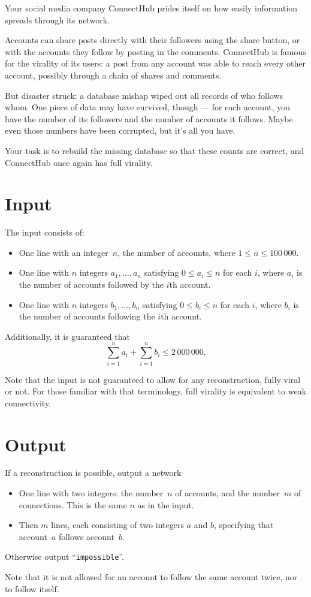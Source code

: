 Your social media company ConnectHub prides itself on how easily 
information spreads through its network.

Accounts can share posts directly with their followers using the 
share button, or with the accounts they follow by posting in the comments. 
ConnectHub is famous for the virality of its users: a post from any account 
was able to reach every other account, possibly through a chain of shares and comments.

But disaster struck: a database mishap wiped out all records of who follows whom. 
One piece of data may have survived, though — for each account, you have the number 
of its followers and the number of accounts it follows.
Maybe even those numbers have been corrupted, but it's all you have.

Your task is to rebuild the missing database so that these counts are correct, 
and ConnectHub once again has full virality.

\section*{Input}

The input consists of:
\begin{itemize}
\item
One line with an integer~$n$, the number of accounts, where $1 \leq n \leq 100\,000$.
\item
 One line with $n$ integers $a_1,\ldots, a_n$ satisfying $0 \leq a_i \leq n$ for each $i$,
 where $a_i$ is the number of accounts followed by the $i$th account.
\item
 One line with $n$ integers $b_1,\ldots, b_n$ satisfying $0 \leq b_i \leq n$ for each  $i$,
 where $b_i$ is the number of accounts following the $i$th account.
\end{itemize}

Additionally, it is guaranteed that 
\[
    \sum_{i=1}^n a_i + \sum_{i=1}^n b_i \leq 2\,000\,000.
\]

Note that the input is not guaranteed to allow for any reconstruction, fully viral or not.
For those familiar with that terminology, full virality is equivalent to weak connectivity.

\section*{Output}

If a reconstruction is possible, output a network
\begin{itemize}
\item One line with two integers: the number~$n$ of accounts, and the number~$m$ of connections. This is the same $n$ as in the input.
\item Then $m$ lines, each consisting of two integers $a$ and $b$, specifying that account~$a$ follows account~$b$.
\end{itemize}

Otherwise output ``\texttt{impossible}''.

Note that it is not allowed for an account to follow the same account twice, nor to follow itself.
